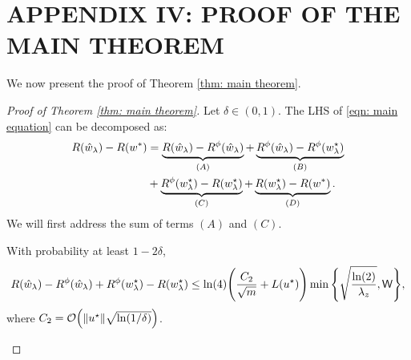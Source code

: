 \section{APPENDIX IV: PROOF OF THE MAIN THEOREM}

We now present the proof of Theorem \ref{thm: main theorem}.

\begin{proof}[Proof of Theorem \ref{thm: main theorem}]
    Let $\delta \in (0,1)$.
    The LHS of \eqref{eqn: main equation} can be decomposed as:
    \begin{equation*}
    \begin{aligned}
        R(\hat{w}_\lambda) - R(w^*) &=
        \underbrace{R(\hat{w}_\lambda) - R^\phi(\hat{w}_\lambda)}_{(A)} +
        \underbrace{R^\phi(\hat{w}_\lambda) - R^\phi(w^\star_{\lambda})}_{(B)} \\
        &+
        \underbrace{R^\phi(w^\star_{\lambda}) - R(w^\star_{\lambda})}_{(C)} +
        \underbrace{R(w^\star_{\lambda}) - R(w^*)}_{(D)}.
    \end{aligned}
    \end{equation*}
    We will first address the sum of terms $(A)$ and $(C)$.
    \begin{claim}
       With probability at least $1-2\delta$,
        \begin{equation*}
        \begin{aligned}
            R(\hat{w}_\lambda) - R^\phi(\hat{w}_\lambda) +
            R^\phi(w^\star_{\lambda}) - R(w^\star_{\lambda})
            \leq \ln(4)\Bigg(\frac{C_2}{\sqrt{m}} +
            L(u^\star)\Bigg) \min\Bigg\{\sqrt{\frac{\ln(2)}{\lambda_z}},
            \mathsf{W}\Bigg\},
        \end{aligned}
        \end{equation*}
        where $C_2 = \mathcal{O}\Big(\|u^\star\|\sqrt{\ln(1/\delta)}\Big)$.
    \end{claim}


\end{proof}
